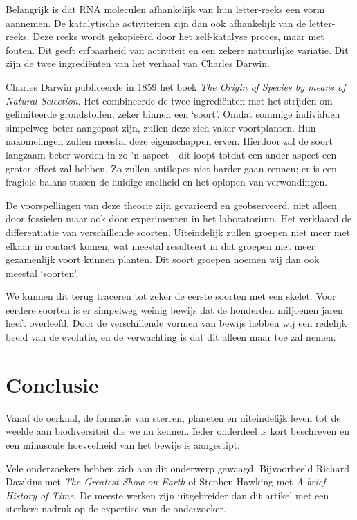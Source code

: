 \documentclass{article}
\begin{document}
        Belangrijk is dat RNA moleculen afhankelijk van hun letter-reeks een vorm aannemen. De katalytische activiteiten zijn dan ook afhankelijk van de letter-reeks. Deze reeks wordt gekopie\"erd door het zelf-katalyse proces, maar met fouten. Dit geeft erfbaarheid van activiteit en een zekere natuurlijke variatie. Dit zijn de twee ingredi\"enten van het verhaal van Charles Darwin. 
    
        Charles Darwin publiceerde in 1859 het boek \emph{The Origin of Species by means of Natural Selection}. Het combineerde de twee ingredi\"enten met het strijden om gelimiteerde grondstoffen, zeker binnen een `soort'. Omdat sommige individuen simpelweg beter aangepast zijn, zullen deze zich vaker voortplanten. Hun nakomelingen zullen meestal deze eigenschappen erven. Hierdoor zal de soort langzaam beter worden in zo 'n aspect - dit loopt totdat een ander aspect een groter effect zal hebben. Zo zullen antilopes niet harder gaan rennen; er is een fragiele balans tussen de huidige snelheid en het oplopen van verwondingen.
        
        De voorspellingen van deze theorie zijn gevarieerd en geobserveerd, niet alleen door fossielen maar ook door experimenten in het laboratorium. Het verklaard de differentiatie van verschillende soorten. Uiteindelijk zullen groepen niet meer met elkaar in contact komen, wat meestal resulteert in dat groepen niet meer gezamenlijk voort kunnen planten. Dit soort groepen noemen wij dan ook meestal `soorten'.
        
        We kunnen dit terug traceren tot zeker de eerste soorten met een skelet. Voor eerdere soorten is er simpelweg weinig bewijs dat de honderden miljoenen jaren heeft overleefd. Door de verschillende vormen van bewijs hebben wij een redelijk beeld van de evolutie, en de verwachting is dat dit alleen maar toe zal nemen.
    \section{Conclusie}
        Vanaf de oerknal, de formatie van sterren, planeten en uiteindelijk leven tot de weelde aan biodiversiteit die we nu kennen. Ieder onderdeel is kort beschreven en een minuscule hoeveelheid van het bewijs is aangestipt. 
        
        Vele onderzoekers hebben zich aan dit onderwerp gewaagd. Bijvoorbeeld Richard Dawkins met \emph{The Greatest Show on Earth} of Stephen Hawking met \emph{A brief History of Time}. De meeste werken zijn uitgebreider dan dit artikel met een sterkere nadruk op de expertise van de onderzoeker.
        
      
\end{document}
